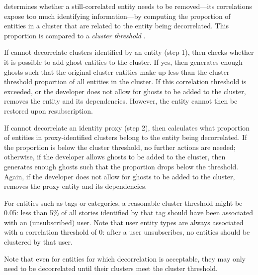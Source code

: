 \sys{} determines whether a still-correlated entity needs to be removed---its correlations expose
too much identifying information---by computing the proportion of entities in a cluster that are
related to the entity being decorrelated. This proportion is compared to a \emph{cluster threshold}
.

If \sys{} cannot decorrelate clusters identified by an entity (step 1), then \sys{} checks whether
it is possible to add ghost entities to the cluster. If yes, then \sys{} generates enough ghosts
such that the original cluster entities make up less than the cluster threshold proportion of
all entities in the cluster.  If this correlation threshold is exceeded, or the developer does not
allow for ghosts to be added to the cluster, \sys{} removes the entity and its dependencies.
However, the entity cannot then be restored upon resubscription.

If \sys{} cannot decorrelate an identity proxy (step 2), then \sys{} calculates what proportion of entities 
in proxy-identified clusters belong to the entity being decorrelated. If the proportion is below the
cluster threshold, no further actions are needed; otherwise, if the developer allows ghosts to be
added to the cluster, then \sys{} generates enough ghosts such that the proportion drops below the
threshold. Again, if the developer does not allow for ghosts to be added to the cluster, \sys{}
removes the proxy entity and its dependencies.

For entities such as tags or categories, a reasonable cluster threshold might be 0.05: less than
5\% of all stories identified by that tag should have been associated with an (unsubscribed) user. Note
that user entity types are always associated with a correlation threshold of 0: after a user
unsubscribes, no entities should be clustered by that user.

Note that even for entities for which decorrelation is acceptable, they may only need to be
decorrelated until their clusters meet the cluster threshold.

